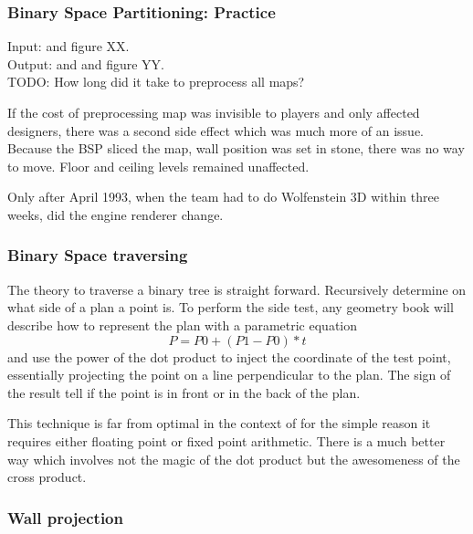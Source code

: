 \subsubsection{Binary Space Partitioning: Practice}
Input: and  figure XX.\\
Output: and  and  figure YY.\\
TODO: How long did it take to preprocess all maps?\\
\par
If the cost of preprocessing map was invisible to players and only affected designers, there was a second side effect which was much more of an issue. Because the BSP sliced the map, wall position was set in stone, there was no way to move. Floor and ceiling levels remained unaffected.\\
\par
Only after April 1993, when the team had to do Wolfenstein 3D within three weeks, did the engine renderer change.\\

\par

\subsubsection{Binary Space traversing}
The theory to traverse a binary tree is straight forward. Recursively determine on what side of a plan a point is. To perform the side test, any geometry book will describe how to represent the plan with a parametric equation $$ P = P0 + (P1 - P0) * t$$
and use the power of the dot product to inject the coordinate of the test point, essentially projecting the point on a line perpendicular to the plan. The sign of the result tell if the point is in front or in the back of the plan.\\
\par
This technique is far from optimal in the context of \doom for the simple reason it requires either floating point or fixed point arithmetic. There is a much better way which involves not the magic of the dot product but the awesomeness of the cross product.\\
\par
{}



\subsubsection{Wall projection}




